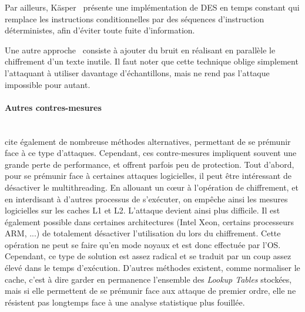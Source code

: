 \documentclass[a4paper,11pt]{article}
\begin{document}
Par ailleurs, Käsper~\cite{kasper2009faster} présente une implémentation de DES en temps constant qui remplace les instructions conditionnelles par des séquences d'instruction déterministes, afin d'éviter toute fuite d'information.

Une autre approche~\cite{osvik2006cache} consiste à ajouter du bruit en réalisant en parallèle le chiffrement d'un texte inutile. Il faut noter que cette technique oblige simplement l'attaquant à utiliser davantage d'échantillons, mais ne rend pas l'attaque impossible pour autant.


\paragraph{Autres contres-mesures} ~\\
\cite{kasper2009faster} cite également de nombreuse méthodes alternatives, permettant de se prémunir face à ce type d'attaques. Cependant, ces contre-mesures impliquent souvent une grande perte de performance, et offrent parfois peu de protection.
Tout d'abord, pour se prémunir face à certaines attaques logicielles, il peut être intéressant de désactiver le multithreading. En allouant un cœur à l'opération de chiffrement, et en interdisant à d'autres processus de s'exécuter, on empêche ainsi les mesures logicielles sur les caches L1 et L2. L'attaque devient ainsi plus difficile.
Il est également possible dans certaines architectures (Intel Xeon, certains processeurs ARM, ...) de totalement désactiver l'utilisation du lors du chiffrement. Cette opération ne peut se faire qu'en mode noyaux et est donc effectuée par l'OS. Cependant, ce type de solution est assez radical et se traduit par un coup assez élevé dans le temps d'exécution.
D'autres méthodes existent, comme normaliser le cache, c'est à dire garder en permanence l'ensemble des \emph{Lookup Tables} stockées, mais si elle permettent de se prémunir face aux attaque de premier ordre, elle ne résistent pas longtemps face à une analyse statistique plus fouillée.
\end{document}
